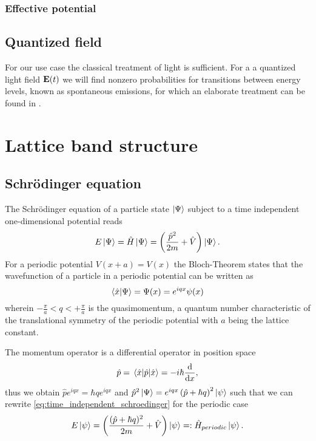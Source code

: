 \subsubsection{Effective potential}

\subsection{Quantized field}

For our use case the classical treatment of light is sufficient. For a
a quantized light field $\vb{E}(t)$ we will find nonzero probabilities
for transitions between energy levels, known as spontaneous emissions,
for which an elaborate treatment can be found in \cite{Gerry2004}.

\section{Lattice band structure}

\subsection{Schrödinger equation}

The Schrödinger equation of a particle state $\ket{\Psi}$ subject to a time
independent one-dimensional potential reads
\begin{align}
  E\ket{\Psi}
  =\hat{H}\ket{\Psi}
  =\left(\frac{\hat{p}^2}{2m}+\hat{V}\right)\ket{\Psi}
  \label{eq:time_independent_schroedinger}.
\end{align}
For a periodic potential $V(x+a)=V(x)$ the Bloch-Theorem \cite{Ashcroft1976}
states that the wavefunction of a particle in a periodic potential can be
written as
\begin{equation}
  \braket{\hat{x}}{\Psi}
  =\Psi(x)
  =e^{iqx}\psi(x)
  \label{eq:bloch_theorem}
\end{equation}
wherein $-\frac{\pi}{a}<q<+\frac{\pi}{a}$ is the quasimomentum, a quantum
number characteristic of the translational symmetry of the periodic potential
\cite[p. 42]{Lewenstein2012} with $a$ being the lattice constant.

The momentum operator is a differential operator in position space
\begin{equation}
  \hat{p}
  =\expval{\hat{p}}{\hat{x}}
  =-i\hbar\dv{x}
  \label{eq:momentum_operator_in_position_space},
\end{equation}
thus we obtain $\hat{p}e^{iqx}=\hbar qe^{iqx}$ and
$\hat{p}^2\ket{\Psi}=e^{iqx}\left(\hat{p}+\hbar q\right)^2\ket{\psi}$ such
that we can rewrite \cref{eq:time_independent_schroedinger} for
the periodic case
\begin{equation}
  E\ket{\psi}
  =\left(\frac{(\hat{p}+\hbar q)^2}{2m}+\hat{V}\right)\ket{\psi}
  =:\hat{H}_{periodic}\ket{\psi}
  \label{eq:periodic_schroedinger}.
\end{equation}

